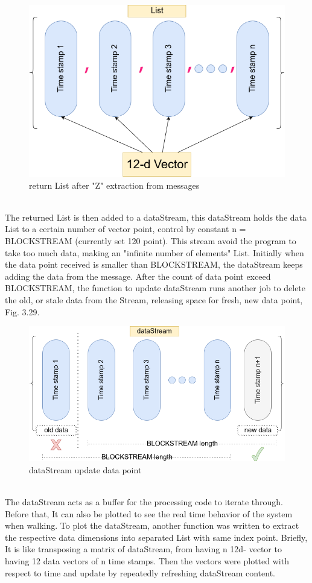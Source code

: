 \documentclass[12 pt, a4paper]{thesis}
\begin{document}
\begin{figure}[hbt!]
\centering
\includegraphics[width = 120mm]{messageReceiver.png}
\caption{ return List after "Z" extraction from messages}
\end{figure}
\\
The returned List is then added to a dataStream, this dataStream holds the data List to a certain number of vector point, control by constant n = BLOCKSTREAM (currently set 120 point). This stream avoid the program to take too much data, making an "infinite number of elements" List. Initially when the data point received is smaller than BLOCKSTREAM, the dataStream keeps adding the data from the message. After the count of data point exceed BLOCKSTREAM, the function to update dataStream runs another job to delete the old, or stale data from the Stream, releasing space for fresh, new data point, Fig. 3.29.
\begin{figure}	
\centering
\includegraphics[width=120mm]{messageReceiver2.png}
\caption{dataStream update data point}
\end{figure}
\\
The dataStream acts as a buffer for the processing code to iterate through. Before that, It can also be plotted to see the real time behavior of the system when walking. To plot the dataStream, another function was written to extract the respective data dimensions into separated List with same index point. Briefly, It is like transposing a matrix of dataStream, from having n 12d- vector to having 12 data vectors of n time stamps. Then the vectors were plotted with respect to time and update by repeatedly refreshing dataStream content.
\end{document}
